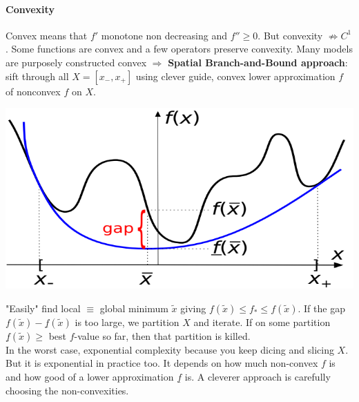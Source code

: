 \documentclass[10pt]{report}
\begin{document}
\paragraph{Convexity} Convex means that $f'$ monotone non decreasing and $f'' \geq 0$. But convexity $\not\Rightarrow C^1$. Some functions are convex and a few operators preserve convexity. Many models are purposely constructed convex $\Rightarrow$  \textbf{Spatial Branch-and-Bound approach}: sift through all $X = [x_-, x_+]$ using clever guide, convex lower approximation \underline{$f$} of nonconvex $f$ on $X$.
\begin{center}
	\includegraphics[scale=0.5]{2.png}
\end{center}
"Easily" find local $\equiv$ global minimum $\tilde{x}$ giving \underline{$f$}$(\tilde{x}) \leq f_* \leq f(\tilde{x})$. If the gap $f(\tilde{x}) - \underline{f}(\tilde{x})$ is too large, we partition $X$ and iterate. If on some partition $\underline{f}(\tilde{x}) \geq$ best $f$-value so far, then that partition is killed.\\
In the worst case, exponential complexity because you keep dicing and slicing $X$. But it is exponential in practice too. It depends on how much non-convex $f$ is and how good of a lower approximation $\underline{f}$ is. A cleverer approach is carefully choosing the non-convexities.
\end{document}

